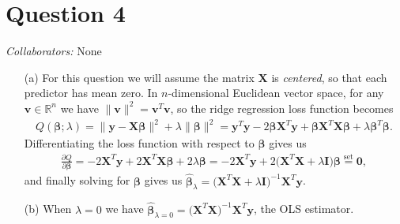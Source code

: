 \documentclass[10pt]{article}
\newcommand{\mycolaba}[1]{\textcolor{colabcol}{\textsl{Collaborators:}} #1}
\begin{document}
\section{Question 4} \noindent
\mycolaba{None}
\begin{itemize}
    \item[(a)] For this question we will assume the matrix \(\mathbf{X}\) is \textsl{centered}, so that each predictor has mean zero. 
    In \(n\)-dimensional Euclidean vector space, for any \(\mathbf{v} \in \mathbb{R}^n\) we have \(\|\mathbf{v}\|^2 = \mathbf{v}^T\mathbf{v}\), 
    so the ridge regression loss function becomes 
    \begin{align*}
        Q(\bm{\beta}; \lambda) 
        = \| \mathbf{y} - \mathbf{X}\bm{\beta} \|^2 + \lambda \|\bm{\beta}\|^2
        = \mathbf{y}^T\mathbf{y} - 2 \bm{\beta}\mathbf{X}^T\mathbf{y} + \bm{\beta} \mathbf{X}^T \mathbf{X} \bm{\beta} + \lambda \bm{\beta}^T \bm{\beta}.
    \end{align*}
    Differentiating the loss function with respect to \(\bm{\beta}\) gives us 
    \begin{align*}
        \frac{\partial Q}{\partial \bm{\beta}}
        = -2 \mathbf{X}^T \mathbf{y} + 2 \mathbf{X}^T\mathbf{X}\bm{\beta} + 2 \lambda \bm{\beta}
        = -2 \mathbf{X}^T \mathbf{y} + 2 \big( \mathbf{X}^T\mathbf{X} + \lambda \mathbf{I} \big) \bm{\beta}
        \overset{\text{set}}{=} \mathbf{0},
    \end{align*}
    and finally solving for \(\bm{\beta}\) gives us 
    \(\hat{\bm{\beta}}_{\lambda} = \big( \mathbf{X}^T\mathbf{X} + \lambda \mathbf{I} \big)^{-1} \mathbf{X}^T\mathbf{y}\).
    \item[(b)] When \(\lambda = 0\) we have \(\hat{\bm{\beta}}_{\lambda = 0} = \big( \mathbf{X}^T\mathbf{X} \big)^{-1} \mathbf{X}^T\mathbf{y}\), the OLS 
    estimator. 
\end{itemize}
\end{document}
